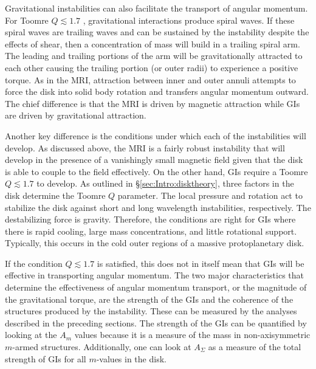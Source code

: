 Gravitational instabilities can also facilitate the transport of angular momentum. For Toomre $Q \lesssim 1.7$ \citep{durisen2007}, gravitational interactions produce spiral waves. If these spiral waves are trailing waves and can be sustained by the instability despite the effects of shear, then a concentration of mass will build in a trailing spiral arm. The leading and trailing portions of the arm will be gravitationally attracted to each other causing the trailing portion (or outer radii) to experience a positive torque. As in the MRI, attraction between inner and outer annuli attempts to force the disk into solid body rotation and transfers angular momentum outward. The chief difference is that the MRI is driven by magnetic attraction while GIs are driven by gravitational attraction.

Another key difference is the conditions under which each of the instabilities will develop. As discussed above, the MRI is a fairly robust instability that will develop in the presence of a vanishingly small magnetic field given that the disk is able to couple to the field effectively. On the other hand, GIs require a Toomre $Q \lesssim 1.7$ to develop. As outlined in \S \ref{sec:Intro:disktheory}, three factors in the disk determine the Toomre $Q$ parameter. The local pressure and rotation act to stabilize the disk against short and long wavelength instabilities, respectively. The destabilizing force is gravity. Therefore, the conditions are right for GIs where there is rapid cooling, large mass concentrations, and little rotational support. Typically, this occurs in the cold outer regions of a massive protoplanetary disk. 

If the condition $Q \lesssim 1.7$ is satisfied, this does not in itself mean that GIs will be effective in transporting angular momentum. The two major characteristics that determine the effectiveness of angular momentum transport, or the magnitude of the gravitational torque, are the strength of the GIs and the coherence of the structures produced by the instability. These can be measured by the analyses described in the preceding sections. The strength of the GIs can be quantified by looking at the $A_m$ values because it is a measure of the mass in non-axisymmetric $m$-armed structures. Additionally, one can look at $A_\Sigma$ as a measure of the total strength of GIs for all $m$-values in the disk.

